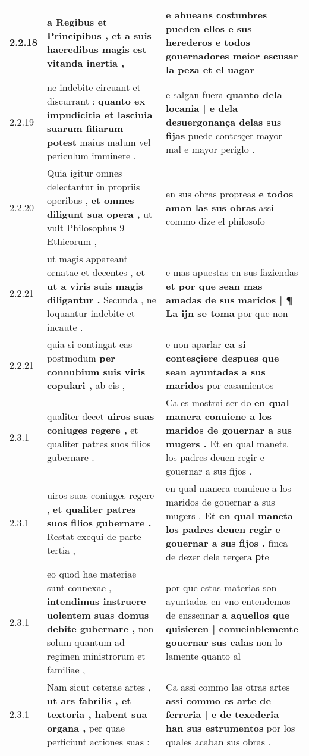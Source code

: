 \begin{tabular}{|p{1cm}|p{6.5cm}|p{6.5cm}|}
2.2.18 & a Regibus et Principibus , \textbf{ et a suis haeredibus } magis est vitanda inertia , & e abueans costunbres pueden ellos \textbf{ e sus herederos } e todos gouernadores meior escusar la peza et el uagar \\\hline
2.2.19 & ne indebite circuant et discurrant : \textbf{ quanto ex impudicitia et lasciuia suarum filiarum potest } maius malum vel periculum imminere . & e salgan fuera \textbf{ quanto dela locania | e dela desuergonança delas sus fijas } puede contesçer mayor mal e mayor periglo . \\\hline
2.2.20 & Quia igitur omnes delectantur in propriis operibus , \textbf{ et omnes diligunt sua opera , } ut vult Philosophus 9 Ethicorum , & en sus obras propreas \textbf{ e todos aman las sus obras } assi commo dize el philosofo \\\hline
2.2.21 & ut magis appareant ornatae et decentes , \textbf{ et ut a viris suis magis diligantur . } Secunda , ne loquantur indebite et incaute . & e mas apuestas en sus faziendas \textbf{ et por que sean mas amadas de sus maridos | ¶ La ijn se toma } por que non \\\hline
2.2.21 & quia si contingat eas postmodum \textbf{ per connubium suis viris copulari , } ab eis , & e non aparlar \textbf{ ca si contesçiere despues que sean ayuntadas a sus maridos } por casamientos \\\hline
2.3.1 & qualiter decet \textbf{ uiros suas coniuges regere , } et qualiter patres suos filios gubernare . & Ca es mostrai ser do \textbf{ en qual manera conuiene a los maridos de gouernar a sus mugers . } Et en qual maneta los padres deuen regir e gouernar a sus fijos . \\\hline
2.3.1 & uiros suas coniuges regere , \textbf{ et qualiter patres suos filios gubernare . } Restat exequi de parte tertia , & en qual manera conuiene a los maridos de gouernar a sus mugers . \textbf{ Et en qual maneta los padres deuen regir e gouernar a sus fijos . } finca de dezer dela terçera ꝑte \\\hline
2.3.1 & eo quod hae materiae sunt connexae , \textbf{ intendimus instruere uolentem suas domus debite gubernare , } non solum quantum ad regimen ministrorum et familiae , & por que estas materias son ayuntadas en vno entendemos de enssennar \textbf{ a aquellos que quisieren | conueinblemente gouernar sus calas } non lo lamente quanto al \\\hline
2.3.1 & Nam sicut ceterae artes , \textbf{ ut ars fabrilis , et textoria , habent sua organa , } per quae perficiunt actiones suas : & Ca assi commo las otras artes \textbf{ assi commo es arte de ferreria | e de texederia han sus estrumentos } por los quales acaban sus obras . \\\hline

\end{tabular}
